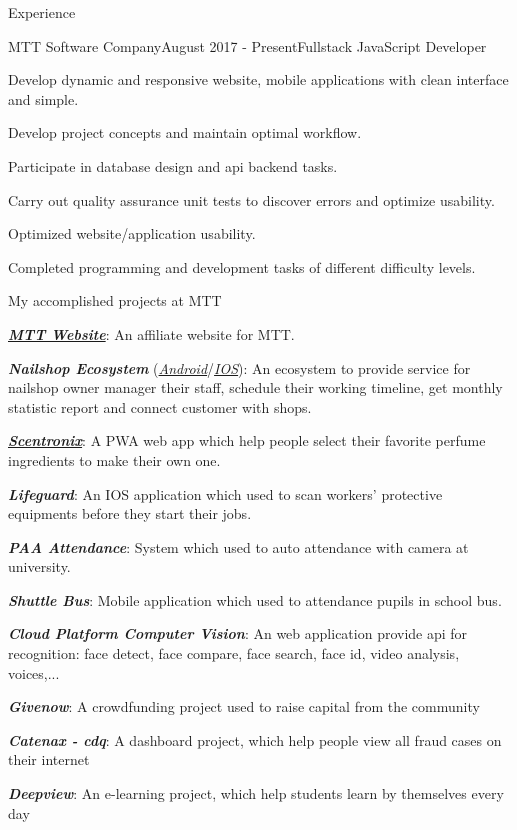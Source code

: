\documentclass{resume}
\begin{document}
  \begin{rSection}{Experience}
    \begin{rSubsection}{MTT Software Company}{August 2017 - Present}{Fullstack JavaScript Developer}{}
      \item Develop dynamic and responsive website, mobile applications with clean interface and simple.
      \item Develop project concepts and maintain optimal workflow.
      \item Participate in database design and api backend tasks.
      \item Carry out quality assurance unit tests to discover errors and optimize usability.
      \item Optimized website/application usability.
      \item Completed programming and development tasks of different difficulty levels.
    \end{rSubsection}
     
    \begin{rSubsection}{}{}{My accomplished projects at MTT}{}
      \item \href{https://mttjsc.com/}{\emph{\bfseries{MTT Website}}}: An affiliate website for MTT.
      \item \emph{\bfseries{Nailshop Ecosystem}} (\href{https://play.google.com/store/apps/developer?id=MTT+Software+Company+LTD}{\emph{Android}}/\href{https://apps.apple.com/us/developer/mttjsc/id1250334932}{\emph{IOS}}): 
      An ecosystem to provide service for nailshop owner manager their staff, schedule their working timeline, get monthly statistic report and connect customer with shops.
      \item \href{https://app.scnt.me/}{\emph{\bfseries{Scentronix}}}: A PWA web app which help people select their favorite perfume ingredients to make their own one.
      \item {\emph{\bfseries{Lifeguard}}}: An IOS application which used to scan workers' protective equipments before they start their jobs. 
      \item {\emph{\bfseries{PAA Attendance}}}: System which used to auto attendance with camera at university.
      \item {\emph{\bfseries{Shuttle Bus}}}: Mobile application which used to attendance pupils in school bus.
      \item {\emph{\bfseries{Cloud Platform Computer Vision}}}: An web application provide api for recognition: face detect, face compare, face search, face id, video analysis, voices,...
      \item {\emph{\bfseries{Givenow}}}: A crowdfunding project used to raise capital from the community
      \item {\emph{\bfseries{Catenax - cdq}}}: A dashboard project, which help people view all fraud cases on their internet
      \item {\emph{\bfseries{Deepview}}}: An e-learning project, which help students learn by themselves every day
    \end{rSubsection}
  \end{rSection}
\end{document}

